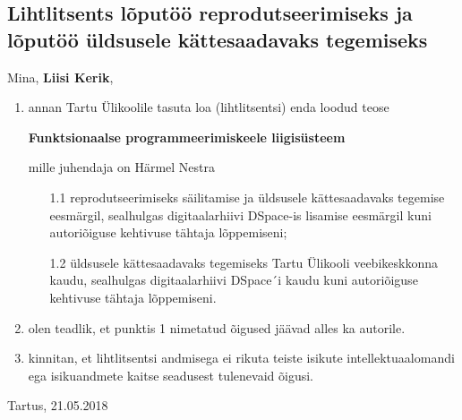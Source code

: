 \documentclass[12pt]{article}
\def\pealkiri{Funktsionaalse programmeerimiskeele liigisüsteem}
\begin{document}
    \subsection*{Lihtlitsents lõputöö reprodutseerimiseks ja lõputöö üldsusele kättesaadavaks tegemiseks}
      Mina, \textbf{Liisi Kerik},

      \begin{enumerate}
        \item
          annan Tartu Ülikoolile tasuta loa (lihtlitsentsi) enda loodud teose

          \textbf{\pealkiri}

          mille juhendaja on Härmel Nestra

          \begin{enumerate}
            \item[1.1]
              reprodutseerimiseks säilitamise ja üldsusele kättesaadavaks tegemise eesmärgil, sealhulgas digitaalarhiivi DSpace-is lisamise eesmärgil kuni autoriõiguse kehtivuse tähtaja lõppemiseni;
            \item[1.2]
              üldsusele kättesaadavaks tegemiseks Tartu Ülikooli veebikeskkonna kaudu, sealhulgas digitaalarhiivi DSpace´i kaudu kuni autoriõiguse kehtivuse tähtaja lõppemiseni.
          \end{enumerate}
        \item
          olen teadlik, et punktis 1 nimetatud õigused jäävad alles ka autorile.
        \item
          kinnitan, et lihtlitsentsi andmisega ei rikuta teiste isikute intellektuaalomandi ega isikuandmete kaitse seadusest tulenevaid õigusi. 
      \end{enumerate}

      \noindent
      Tartus, 21.05.2018
\end{document}
